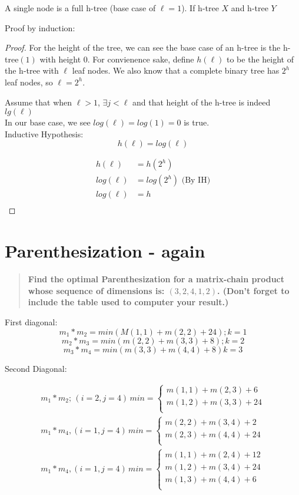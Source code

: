 \documentclass[titlepage]{article}\usepackage[]{graphicx}\usepackage[]{color}
\begin{document}
A single node is a full h-tree (base case of $\ell = 1 $). If h-tree $X$ and
h-tree $Y$ 


Proof by induction:
\begin{proof}
For the height of the tree, we can see the base case of an h-tree is the
h-tree$(1)$ with height 0. For convienence sake, define $h(\ell)$ to be
the height of the h-tree with $\ell$ leaf nodes. We also know that a complete
binary tree has $2^h$ leaf nodes, so $\ell = 2^h$. 

Assume that when $\ell > 1$,  $ \exists j < \ell $ and that height of the h-tree is
indeed $lg(\ell)$\\
In our base case, we see $log(\ell) = log(1) = 0$ is true. \\
Inductive Hypothesis: \[ h(\ell) = log(\ell) \]

\begin{align*}
  h(\ell) &= h(2^h) \\
  log(\ell) &= log(2^h) \text{ (By IH)} \\ 
  log(\ell) &= h \\
\end{align*}
\end{proof}



\section{Parenthesization - again }
\begin{quote}
 \textbf{ Find the optimal Parenthesization for a matrix-chain product whose sequence
  of dimensions is: $(3,2,4,1,2)$. (Don't forget to include the table used to
computer your result.)}
\end{quote}

First diagonal:
\[ m_1 * m_2 = min \left( M(1,1) + m(2,2) + 24\right); k=1 \]
\[ m_2 * m_3 = min \left( m(2,2) + m(3,3) + 8 \right); k=2 \]
\[ m_3 * m_4 = min \left( m(3,3) + m(4,4) + 8 \right) k =3 \]


Second Diagonal:

\begin{align*}
	m_1 * m_2;\, (i = 2, j=4)\, min =  \begin{cases} 
				m(1,1) + m(2,3) + 6 \\
				m(1,2) + m(3,3) + 24 \\ 
			\end{cases} \\
	m_1 * m_4 , (i=1, j=4)\, min = \begin{cases}
				m(2,2) + m(3,4) + 2 \\
				m(2,3) + m(4,4) + 24 \\
			\end{cases} \\
	m_1 * m_4, (i =1, j=4 )\, min = \begin{cases}
				m(1,1) + m(2,4) + 12 \\
				m(1,2) + m(3,4) + 24 \\
				m(1,3) + m(4,4) + 6  \\
			\end{cases} \\
\end{align*}
\end{document}

